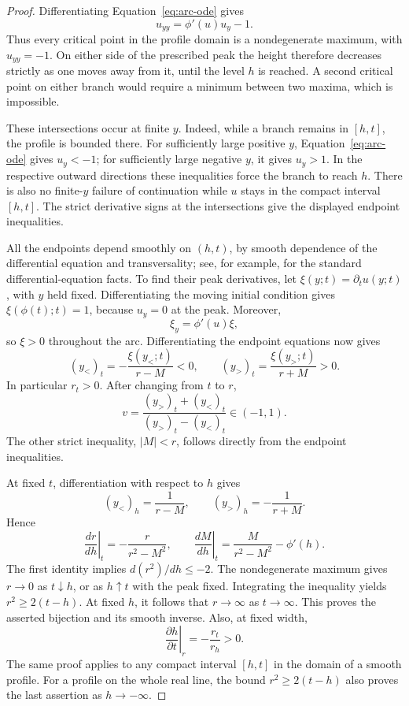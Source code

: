 \begin{proof}
Differentiating Equation~\eqref{eq:arc-ode} gives
\[
  u_{yy}=\phi'(u)u_y-1.
\]
Thus every critical point in the profile domain is a nondegenerate
maximum, with \(u_{yy}=-1\). On either side of the prescribed peak the
height therefore decreases strictly as one moves away from it, until
the level \(h\) is reached. A second critical point on either branch
would require a minimum between two maxima, which is impossible.

These intersections occur at finite \(y\). Indeed, while a branch remains
in \([h,t]\), the profile is bounded there. For sufficiently large
positive \(y\), Equation~\eqref{eq:arc-ode} gives \(u_y<-1\); for
sufficiently large negative \(y\), it gives \(u_y>1\). In the respective
outward directions these inequalities force the branch to reach \(h\).
There is also no finite-\(y\) failure of continuation while \(u\) stays
in the compact interval \([h,t]\). The strict derivative signs at the
intersections give the displayed endpoint inequalities.

All the endpoints depend smoothly on \((h,t)\), by smooth dependence
of the differential equation and transversality; see, for example,
\cite[Sections~2.2--2.3]{Perko} for the standard differential-equation
facts. To find their peak
derivatives, let \(\xi(y;t)=\partial_t u(y;t)\), with \(y\) held fixed.
Differentiating the moving initial condition gives
\(\xi(\phi(t);t)=1\), because \(u_y=0\) at the peak. Moreover,
\[
  \xi_y=\phi'(u)\xi,
\]
so \(\xi>0\) throughout the arc. Differentiating the endpoint equations
now gives
\[
  (y_<)_t=-\frac{\xi(y_<;t)}{r-M}<0,\qquad
  (y_>)_t=\frac{\xi(y_>;t)}{r+M}>0.
\]
In particular \(r_t>0\). After changing from \(t\) to \(r\),
\[
  v=\frac{(y_>)_t+(y_<)_t}{(y_>)_t-(y_<)_t}\in(-1,1).
\]
The other strict inequality, \(|M|<r\), follows directly from the
endpoint inequalities.

At fixed \(t\), differentiation with respect to \(h\) gives
\[
  (y_<)_h=\frac1{r-M},\qquad
  (y_>)_h=-\frac1{r+M}.
\]
Hence
\begin{equation}\label{eq:arc-width-height}
  \left.\frac{dr}{dh}\right|_t=-\frac{r}{r^2-M^2},\qquad
  \left.\frac{dM}{dh}\right|_t
       =\frac{M}{r^2-M^2}-\phi'(h).
\end{equation}
The first identity implies \(d(r^2)/dh\le-2\).
The nondegenerate maximum gives \(r\to0\) as \(t\downarrow h\), or as
\(h\uparrow t\) with the peak fixed. Integrating the inequality yields
\(r^2\ge2(t-h)\). At fixed \(h\), it follows that \(r\to\infty\) as
\(t\to\infty\). This proves the asserted bijection and its smooth
inverse. Also, at fixed width,
\[
  \left.\frac{\partial h}{\partial t}\right|_r
    =-\frac{r_t}{r_h}>0.
\]
The same proof applies to any compact interval \([h,t]\) in the domain
of a smooth profile. For a profile on the whole real line, the bound
\(r^2\ge2(t-h)\) also proves the last assertion as \(h\to-\infty\).
\end{proof}


